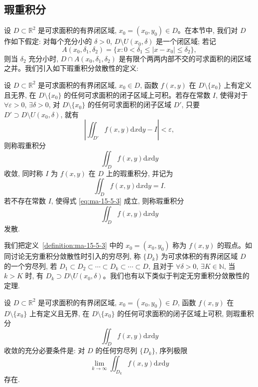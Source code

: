 \subsection{瑕重积分}
\label{subsec:ma-15-5-3}

设 $D\subset\mathbb R^2$ 是可求面积的有界闭区域, $x_0=(x_0,y_0)\in D$。在本节中, 我们对 $D$ 作如下假定: 对每个充分小的 $\delta>0$, $D\setminus U(x_0,\delta)$ 是一个闭区域; 若记
\[
  A(x_0,\delta_1,\delta_2)=\{x:0<\delta_1\leqslant |x-x_0|\leqslant\delta_2\},
\]
则当 $\delta_2$ 充分小时, $D\cap A(x_0,\delta_1,\delta_2)$ 是有限个两两内部不交的可求面积的闭区域之并。我们引入如下瑕重积分敛散性的定义:

\begin{definition}\label{definition:ma-15-5-3}
设 $D\subset\mathbb R^2$ 是可求面积的有界闭区域, $x_0\in D$, 函数 $f(x,y)$ 在 $D\setminus\{x_0\}$ 上有定义且无界, 在 $D\setminus\{x_0\}$ 的任何可求面积的闭子区域上可积。若存在常数 $I$, 使得对于 $\forall\varepsilon>0$, $\exists\delta>0$, 对 $D\setminus\{x_0\}$ 的任何可求面积的闭子区域 $D'$, 只要 $D'\supset D\setminus U(x_0,\delta)$, 就有
\begin{equation}
  \left|\iint_{D'}f(x,y)\mathrm dx\mathrm dy-I\right|<\varepsilon,
  \label{eq:ma-15-5-3}
\end{equation}
则称瑕重积分
\[
  \iint_D f(x,y)\mathrm dx\mathrm dy
\]
收敛, 同时称 $I$ 为 $f(x,y)$ 在 $D$ 上的瑕重积分, 并记为
\[
  \iint_D f(x,y)\mathrm dx\mathrm dy=I.
\]
若不存在常数 $I$, 使得式 \eqref{eq:ma-15-5-3} 成立, 则称瑕重积分
\[
  \iint_D f(x,y)\mathrm dx\mathrm dy
\]
发散.
\end{definition}


\begin{remark}\label{remark:ma-15-source-88}
我们把定义~\ref{definition:ma-15-5-3} 中的 $x_0=(x_0,y_0)$ 称为 $f(x,y)$ 的瑕点。如同讨论无穷重积分敛散性时引入的穷尽列, 称 $\{D_k\}$ 为可求体积的有界闭区域 $D$ 的一个穷尽列, 若 $D_1\subset D_2\subset\cdots\subset D_k\subset\cdots\subset D$, 且对于 $\forall\delta>0$, $\exists K\in\mathbb N$, 当 $k>K$ 时, 有 $D_k\supset D\setminus U(x_0,\delta)$。我们也有以下类似于判定无穷重积分敛散性的定理.
\end{remark}


\begin{theorem}\label{theorem:ma-15-5-6}
设 $D\subset\mathbb R^2$ 是可求面积的有界闭区域, $x_0=(x_0,y_0)\in D$, 函数 $f(x,y)$ 在 $D\setminus\{x_0\}$ 上有定义且无界, 在 $D\setminus\{x_0\}$ 的任何可求面积的闭子区域上可积, 则瑕重积分
\[
  \iint_D f(x,y)\mathrm dx\mathrm dy
\]
收敛的充分必要条件是: 对 $D$ 的任何穷尽列 $\{D_k\}$, 序列极限
\[
  \lim_{k\to\infty}\iint_{D_k}f(x,y)\mathrm dx\mathrm dy
\]
存在.
\end{theorem}


